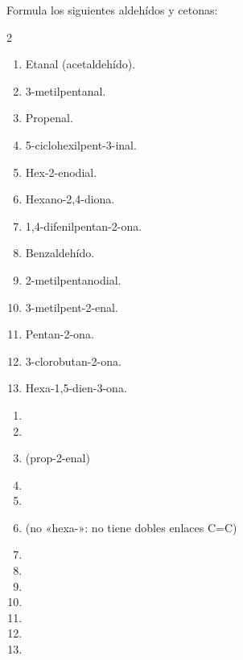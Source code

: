 \begin{exercise}
    Formula los siguientes aldehídos y cetonas:
    \begin{multicols}{2}
        \begin{enumerate}[label=\alph*)]
            \item Etanal (acetaldehído).
            \item 3-metilpentanal.
            \item Propenal.
            \item 5-ciclohexilpent-3-inal.
            \item Hex-2-enodial.
            \item Hexano-2,4-diona.
            \item 1,4-difenilpentan-2-ona.
            \item Benzaldehído.
            \item 2-metilpentanodial.
            \item 3-metilpent-2-enal.
            \item Pentan-2-ona.
            \item 3-clorobutan-2-ona.
            \item Hexa-1,5-dien-3-ona.
        \end{enumerate}
    \end{multicols}
    \begin{solu}
        \begin{enumerate}[label=\alph*)]
            \item {}
            \item {}
            \item {} (prop-2-enal)
            \item {}
            \item {}
            \item {} (no «hexa-»: no tiene dobles enlaces C=C)
            \item {}
            \item {}
            \item {}
            \item {}
            \item {}
            \item {}
            \item {}
        \end{enumerate}
    \end{solu}
\end{exercise}

